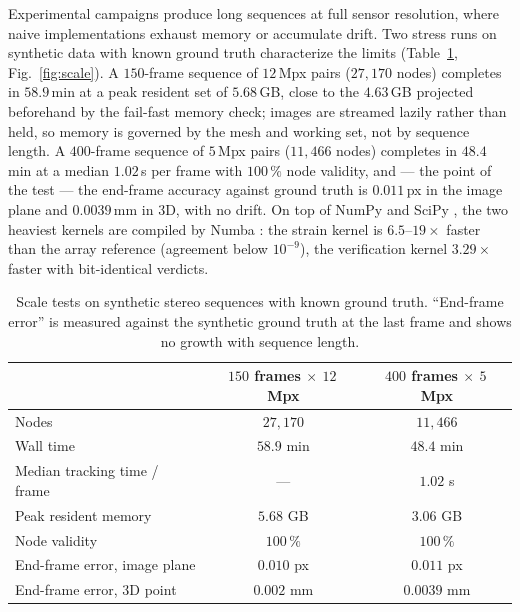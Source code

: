 Experimental campaigns produce long sequences at full sensor resolution, where naive implementations exhaust memory or accumulate drift. Two stress runs on synthetic data with known ground truth characterize the limits (Table~\ref{tab:perf}, Fig.~\ref{fig:scale}). A $150$-frame sequence of $12$\,Mpx pairs ($27{,}170$ nodes) completes in $58.9$\,min at a peak resident set of $5.68$\,GB, close to the $4.63$\,GB projected beforehand by the fail-fast memory check; images are streamed lazily rather than held, so memory is governed by the mesh and working set, not by sequence length. A $400$-frame sequence of $5$\,Mpx pairs ($11{,}466$ nodes) completes in $48.4$\,min at a median $1.02$\,s per frame with $100\,\%$ node validity, and --- the point of the test --- the end-frame accuracy against ground truth is $0.011$\,px in the image plane and $0.0039$\,mm in 3D, with no drift. On top of NumPy and SciPy \cite{harris2020numpy,virtanen2020scipy}, the two heaviest kernels are compiled by Numba \cite{lam2015numba}: the strain kernel is $6.5$--$19\times$ faster than the array reference (agreement below $10^{-9}$), the verification kernel $3.29\times$ faster with bit-identical verdicts.

\begin{table}[htbp]
\centering
\caption{Scale tests on synthetic stereo sequences with known ground truth. ``End-frame error'' is measured against the synthetic ground truth at the last frame and shows no growth with sequence length.}
\label{tab:perf}
\begin{tabular}{lcc}
\toprule
 & $150$ frames $\times$ $12$\,Mpx & $400$ frames $\times$ $5$\,Mpx \\
\midrule
Nodes                        & $27{,}170$ & $11{,}466$ \\
Wall time                    & $58.9$ min & $48.4$ min \\
Median tracking time / frame & ---        & $1.02$ s \\
Peak resident memory         & $5.68$ GB  & $3.06$ GB \\
Node validity                & $100\,\%$  & $100\,\%$ \\
End-frame error, image plane & $0.010$ px & $0.011$ px \\
End-frame error, 3D point    & $0.002$ mm & $0.0039$ mm \\
\bottomrule
\end{tabular}
\end{table}

